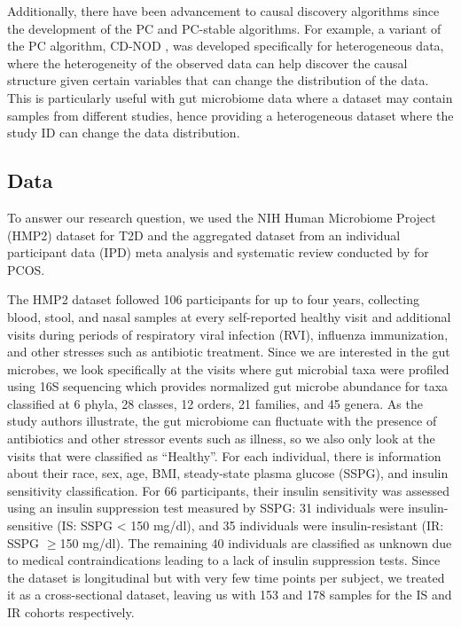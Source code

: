 \documentclass[12pt,letterpaper]{article}
\begin{document}
Additionally, there have been advancement to causal discovery algorithms since the development of the PC and PC-stable algorithms. For example, a variant of the PC algorithm, CD-NOD \citep{huang2019cdnod}, was developed specifically for heterogeneous data, where the heterogeneity of the observed data can help discover the causal structure given certain variables that can change the distribution of the data. This is particularly useful with gut microbiome data where a dataset may contain samples from different studies, hence providing a heterogeneous dataset where the study ID can change the data distribution. 

\subsection{Data}

To answer our research question, we used the NIH Human Microbiome Project (HMP2) dataset \citep{zhou2019t2d} for T2D and the aggregated dataset from an individual participant data (IPD) meta analysis and systematic review conducted by \citep{yang2024pcos} for PCOS. 

The HMP2 dataset \citep{zhou2019t2d} followed 106 participants for up to four years, collecting blood, stool, and nasal samples at every self-reported healthy visit and additional visits during periods of respiratory viral infection (RVI), influenza immunization, and other stresses such as antibiotic treatment. Since we are interested in the gut microbes, we look specifically at the visits where gut microbial taxa were profiled using 16S sequencing which provides normalized gut microbe abundance for taxa classified at 6 phyla, 28 classes, 12 orders, 21 families, and 45 genera. As the study authors illustrate, the gut microbiome can fluctuate with the presence of antibiotics and other stressor events such as illness, so we also only look at the visits that were classified as “Healthy”. For each individual, there is information about their race, sex, age, BMI, steady-state plasma glucose (SSPG), and insulin sensitivity classification. For 66 participants, their insulin sensitivity was assessed using an insulin suppression test measured by SSPG: 31 individuals were insulin-sensitive (IS: SSPG < 150 mg/dl), and 35 individuals were insulin-resistant (IR: SSPG $\geq$150 mg/dl). The remaining 40 individuals are classified as unknown due to medical contraindications leading to a lack of insulin suppression tests. Since the dataset is longitudinal but with very few time points per subject, we treated it as a cross-sectional dataset, leaving us with 153 and 178 samples for the IS and IR cohorts respectively.
\end{document}
